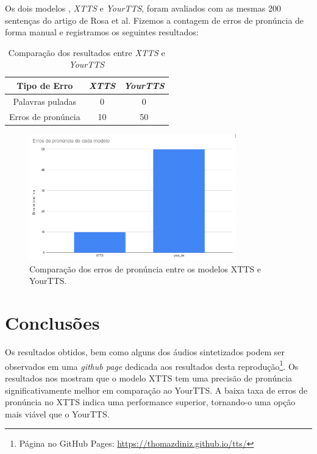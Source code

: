 \documentclass[a4paper,12pt]{article}
\begin{document}
	Os dois modelos , \textit{XTTS} e \textit{YourTTS}, foram avaliados com as mesmas 200 sentenças do artigo de Rosa et al. Fizemos a contagem de erros de pronúncia de forma manual e registramos os seguintes resultados:

\begin{table}[h!]
\centering
\begin{tabular}{|c|c|c|}
\hline
Tipo de Erro & \textit{XTTS} & \textit{YourTTS} \\ \hline
Palavras puladas & 0 & 0 \\ \hline
Erros de pronúncia & 10 & 50 \\ \hline
\end{tabular}
\caption{Comparação dos resultados entre \textit{XTTS} e \textit{YourTTS}}
\label{tab:my_table}
\end{table}


\begin{figure}[h!]
\centering
\includegraphics[width=0.8\textwidth]{imgs/histograma_erros.png}
\caption{Comparação dos erros de pronúncia entre os modelos XTTS e YourTTS.}
\label{fig:comparison}
\end{figure}


\section{Conclusões}
Os resultados obtidos, bem como alguns dos áudios sintetizados podem ser observados em uma \textit{github page} dedicada aos resultados desta reprodução\footnote{Página no GitHub Pages: \url{https://thomazdiniz.github.io/tts/}}. Os resultados nos mostram que o modelo XTTS tem uma precisão de pronúncia significativamente melhor em comparação ao YourTTS. A baixa taxa de erros de pronúncia no XTTS indica uma performance superior, tornando-o uma opção mais viável que o YourTTS.

	
	
	
\end{document}
